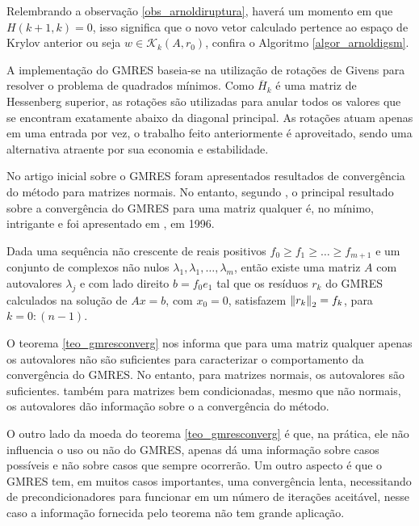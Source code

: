 Relembrando a observação \ref{obs_arnoldiruptura}, haverá um momento em que $H(k+1,k)=0$, isso significa que  o novo vetor calculado pertence ao espaço de Krylov anterior ou seja $w\in\mathcal{K}_k(A,r_0)$, confira o Algoritmo \ref{algor_arnoldigsm}. 

A implementação do GMRES baseia-se na utilização de rotações de Givens para resolver o problema de quadrados mínimos. Como $\overline{H}_k$ é uma matriz de Hessenberg superior, as rotações são  utilizadas para anular todos os valores que se encontram exatamente abaixo da diagonal principal. As rotações atuam apenas em uma entrada por vez, o trabalho feito anteriormente é aproveitado, sendo uma alternativa atraente por sua economia e estabilidade.

No artigo inicial sobre o GMRES \cite{SaadSchultz86GMRES} foram apresentados resultados de convergência do método para matrizes normais. No entanto, segundo \cite{Vorst03Iterative}, o principal resultado sobre a convergência do GMRES para uma matriz qualquer é, no mínimo, intrigante e foi apresentado em \cite{GreenbaumPtakEtAl96Any}, em 1996.
\begin{teore}\label{teo_gmresconverg}
Dada uma  sequência não crescente de reais positivos $f_0\ge f_1\ge\ldots \ge f_{m+1}$ e um conjunto de complexos não nulos $\lambda_1,\lambda_1,\ldots,\lambda_m$, então existe uma matriz $A$ com autovalores $\lambda_j$ e com lado direito $b=f_0e_1$ tal que os  resíduos $r_k$ do GMRES calculados na solução de $Ax=b$, com $x_0=0$, satisfazem ${\Vert r_k\Vert}_2=f_k$, para $k=0:(n-1)$.
\end{teore}
\begin{obs}\label{obs_gmresconv}
O teorema \ref{teo_gmresconverg} nos informa que para uma matriz qualquer apenas os autovalores não são  suficientes para caracterizar o comportamento da convergência do GMRES. No entanto, para matrizes normais, os autovalores são  suficientes. também para matrizes bem condicionadas, mesmo que não normais, os autovalores dão informação sobre o a convergência do  método.
\end{obs}
\begin{obs}\label{obs_gmresconvcontraponto}
O outro lado da moeda do teorema \ref{teo_gmresconverg} é que, na prática, ele não influencia o uso ou não do GMRES, apenas dá uma informação sobre casos possíveis e não sobre casos que sempre ocorrerão. Um outro aspecto é que o GMRES tem, em muitos casos importantes, uma convergência lenta, necessitando de precondicionadores para funcionar em um número de iterações aceitável, nesse caso a informação fornecida pelo teorema não tem grande aplicação.
\end{obs}

